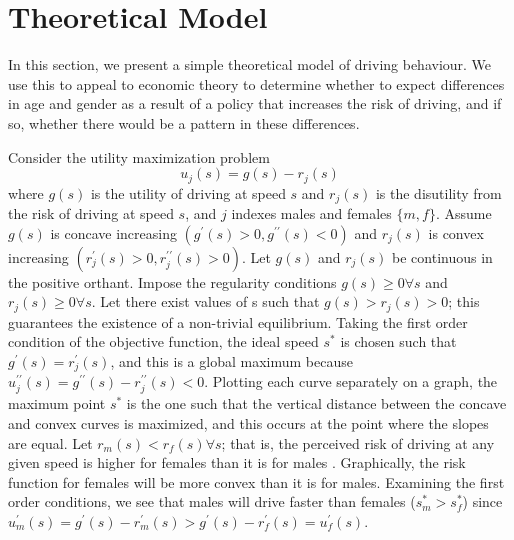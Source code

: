 \section{Theoretical Model}
\label{sec:Model}

In this section, we present a simple theoretical model of driving behaviour. 
We use this to appeal to economic theory to determine whether to expect 
differences in age and gender as a result of a policy that increases the risk of driving, 
and if so, whether there would be a pattern in these differences. 

Consider the utility maximization problem 
%
\begin{equation}
	u_j (s) = g(s) - r_j (s)
\end{equation}
% 
where $g(s)$ is the utility of driving at speed $s$ 
and $r_j (s)$ is the disutility from the risk of driving at speed $s$, 
and $j$ indexes males and females $\{m,f\}$. 
% 
Assume $g(s)$ is concave increasing $(g^{\prime} (s)>0, g^{\prime\prime} (s)<0)$ and $r_j (s)$ is convex increasing $(r_j^{\prime} (s)>0, r_j^{\prime\prime} (s)>0)$. Let $g(s)$ and $r_j (s)$ be continuous in the positive orthant. Impose the regularity conditions $g(s)\geq0 \forall s$ and $r_j (s)\geq0 \forall s$. Let there exist values of s such that $g(s)>r_j (s)>0$; this guarantees the existence of a non-trivial equilibrium. Taking the first order condition of the objective function, the ideal speed $s^*$ is chosen such that $g^{\prime} (s)=r_j^{\prime} (s)$, and this is a global maximum because $u_j^{\prime\prime} (s)=g^{\prime\prime} (s)-r_j^{\prime\prime} (s)<0$. Plotting each curve separately on a graph, the maximum point $s^*$ is the one such that the vertical distance between the concave and convex curves is maximized, and this occurs at the point where the slopes are equal. Let $r_m (s)<r_f (s)  \forall s$; that is, the perceived risk of driving at any given speed is higher for females than it is for males 
\citep{crosongneezy2009}.
Graphically, the risk function for females will be more convex than it is for males. Examining the first order conditions, we see that males will drive faster than females ($s_m^*>s_f^*$) since $u_m^{\prime} (s)=g^{\prime} (s)-r_m^{\prime} (s)>g^{\prime} (s)-r_f^{\prime} (s)=u_f^{\prime} (s)$. \\



